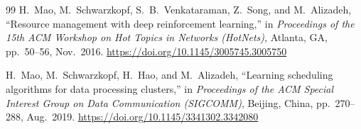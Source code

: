 \documentclass[11pt,a4paper]{article}
\begin{document}
\begin{thebibliography}{99}
H.~Mao, M.~Schwarzkopf, S.~B.~Venkataraman, Z.~Song, and M.~Alizadeh,
``Resource management with deep reinforcement learning,''
in \textit{Proceedings of the 15th ACM Workshop on Hot Topics in Networks (HotNets)}, Atlanta, GA, pp.~50--56, Nov.~2016.
\url{https://doi.org/10.1145/3005745.3005750}

H.~Mao, M.~Schwarzkopf, H.~Hao, and M.~Alizadeh,
``Learning scheduling algorithms for data processing clusters,''
in \textit{Proceedings of the ACM Special Interest Group on Data Communication (SIGCOMM)}, Beijing, China, pp.~270--288, Aug.~2019.
\url{https://doi.org/10.1145/3341302.3342080}

\end{thebibliography}
\end{document}
